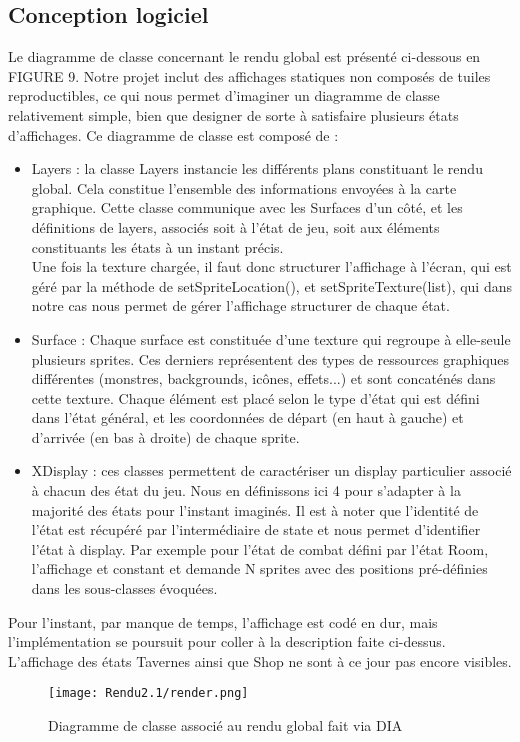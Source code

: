 \documentclass[a4paper,12pt]{article}
\begin{document}
\subsection{Conception logiciel}
Le diagramme de classe concernant le rendu global est présenté ci-dessous en FIGURE 9. Notre projet inclut des affichages statiques non composés de tuiles reproductibles, ce qui nous permet d'imaginer un diagramme de classe relativement simple, bien que designer de sorte à satisfaire plusieurs états d'affichages. Ce diagramme de classe est composé de : 
\newpage
\begin{itemize}
    \item Layers : la classe Layers instancie les différents plans constituant le rendu global. Cela constitue l'ensemble des informations envoyées à la carte graphique. Cette classe communique avec les Surfaces d'un côté, et les définitions de layers, associés soit à l'état de jeu, soit aux éléments constituants les états à un instant précis. 
    \\ Une fois la texture chargée, il faut donc structurer l'affichage à l'écran, qui est géré par la méthode de setSpriteLocation(), et setSpriteTexture(list), qui dans notre cas nous permet de gérer l'affichage structurer de chaque état. 
    \item Surface : Chaque surface est constituée d'une texture qui regroupe à elle-seule plusieurs sprites. Ces derniers représentent des types de ressources graphiques différentes (monstres, backgrounds, icônes, effets...) et sont concaténés dans cette texture. Chaque élément est placé selon le type d'état qui est défini dans l'état général, et les coordonnées de départ (en haut à gauche) et d'arrivée (en bas à droite) de chaque sprite.
    \item XDisplay : ces classes permettent de caractériser un display particulier associé à chacun des état du jeu. Nous en définissons ici 4 pour s'adapter à la majorité des états pour l'instant imaginés. Il est à noter que l'identité de l'état est récupéré par l'intermédiaire de state et nous permet d'identifier l'état à display. Par exemple pour l'état de combat défini par l'état Room, l'affichage et constant et demande N sprites avec des positions pré-définies dans les sous-classes évoquées.
\end{itemize}
Pour l'instant, par manque de temps, l'affichage est codé en dur, mais l'implémentation se poursuit pour coller à la description faite ci-dessus. L'affichage des états Tavernes ainsi que Shop ne sont à ce jour pas encore visibles. 

\begin{figure}[!ht]
  \centering
  \texttt{[image: Rendu2.1/render.png]}
  \caption{Diagramme de classe associé au rendu global fait via DIA}
\end{figure}
\end{document}
